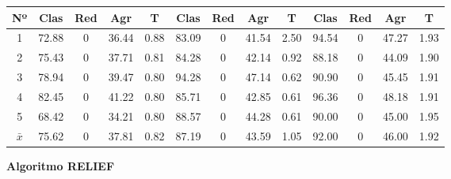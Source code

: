\documentclass[12pt]{article}
\begin{document}
\begin{table}[h]
\begin{tabular}{ccccc|cccc|cccc}
\textbf{Nº} & \textbf{Clas} & \textbf{Red} & \textbf{Agr} & \textbf{T} & \textbf{Clas} & \textbf{Red} & \textbf{Agr} & \textbf{T} & \textbf{Clas} & \textbf{Red} & \textbf{Agr} & \textbf{T} \\ \hline
1           & 72.88         & 0            & 36.44        & 0.88       & 83.09        & 0            & 41.54        & 2.50      & 94.54         & 0            & 47.27        & 1.93       \\
2           & 75.43            & 0            & 37.71          & 0.81       & 84.28         & 0            & 42.14        & 0.92       & 88.18         & 0            & 44.09        & 1.90       \\
3           & 78.94         & 0            & 39.47        & 0.80       & 94.28         & 0            & 47.14        & 0.62       & 90.90         & 0            & 45.45        & 1.91       \\
4           & 82.45        & 0            & 41.22        & 0.80       & 85.71        & 0            & 42.85        & 0.61       & 96.36         & 0            & 48.18        & 1.91       \\
5           & 68.42         & 0            & 34.21        & 0.80       & 88.57         & 0            & 44.28        & 0.61       & 90.00         & 0            & 45.00        & 1.95       \\ \hline
$\bar{x}$           & 75.62         & 0            & 37.81        & 0.82       & 87.19         & 0            & 43.59       & 1.05       & 92.00        & 0            & 46.00        & 1.92
\end{tabular}
\end{table}

\newpage

\textbf{Algoritmo RELIEF}
\end{document}
